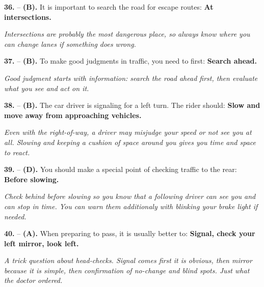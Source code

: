 \begin{minipage}{\linewidth}
\noindent\textbf{36.}  -- \textbf {(B).} It is important to search the road for escape routes:  \textbf {At intersections.} \par \textit {Intersections are probably the most dangerous place, so always know where you can change lanes if something does wrong.} \\
\end{minipage}

\begin{minipage}{\linewidth}
\noindent\textbf{37.}  -- \textbf {(B).} To make good judgments in traffic, you need to first:  \textbf {Search ahead.} \par \textit {Good judgment starts with information: search the road ahead first, then evaluate what you see and act on it.} \\
\end{minipage}

\begin{minipage}{\linewidth}
\noindent\textbf{38.}  -- \textbf {(B).} The car driver is signaling for a left turn. The rider should:  \textbf {Slow and move away from approaching vehicles.} \par \textit {Even with the right-of-way, a driver may misjudge your speed or not see you at all. Slowing and keeping a cushion of space around you gives you time and space to react.} \\
\end{minipage}

\begin{minipage}{\linewidth}
\noindent\textbf{39.}  -- \textbf {(D).} You should make a special point of checking traffic to the rear:  \textbf {Before slowing.} \par \textit {Check behind before slowing so you know that a following driver can see you and can stop in time. You can warn them additionaly with blinking your brake light if needed.} \\
\end{minipage}

\begin{minipage}{\linewidth}
\noindent\textbf{40.}  -- \textbf {(A).} When preparing to pass, it is usually better to:  \textbf {Signal, check your left mirror,  look left.} \par \textit {A trick question about head-checks. Signal comes first it is obvious, then mirror because it is simple, then confirmation of no-change and blind spots. Just what the doctor ordered.} \\
\end{minipage}

